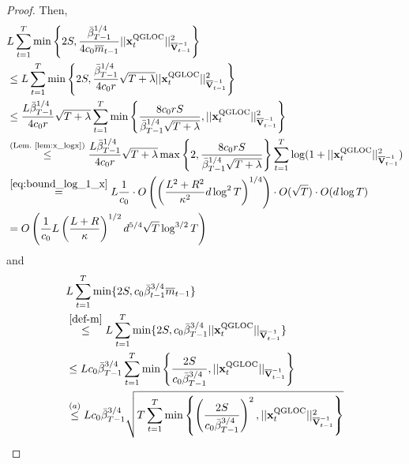 \begin{proof}

Then,
\begin{align*}
  &L\sum_{t=1}^T \min\left\{ 2S, { \frac{\bar\beta_{T-1}^{1/4}}{4 c_0 \overline{m}_{t-1}} } { ||\mathbf{x}_t^{\text{\normalfont QGLOC}}||^2_{\overline{\mathbf{V}}^{-1}_{t-1}} } \right\} 
\\&\le L\sum_{t=1}^T \min\left\{ 2S, { \frac{\bar\beta_{T-1}^{1/4}}{4 c_0 r} } \sqrt{T + \lambda} ||\mathbf{x}_t^{\text{\normalfont QGLOC}}||^2_{\overline{\mathbf{V}}^{-1}_{t-1}}  \right\}
\\&\le { \frac{L\bar\beta^{1/4}_{T-1}}{4c_0 r} } \sqrt{T + \lambda} \sum_{t=1}^T \min\left\{{ \frac{8 c_0 r S }{\bar\beta^{1/4}_{T-1} \sqrt{T + \lambda}} }, ||\mathbf{x}_t^{\text{\normalfont QGLOC}}||^2_{\overline{\mathbf{V}}^{-1}_{t-1}} \right\}
\\&\stackrel{(\text{Lem.~\ref{lem:x_logx}})}{\le} { \frac{L\bar\beta^{1/4}_{T-1}}{4c_0 r} } \sqrt{T + \lambda} \max\left\{2, { \frac{8 c_0 r S }{\bar\beta^{1/4}_{T-1} \sqrt{T + \lambda}} } \right\} \sum_{t=1}^T \log( 1 + ||\mathbf{x}_t^{\text{\normalfont QGLOC}}||^2_{\overline{\mathbf{V}}^{-1}_{t-1}} ) 
\\&\stackrel{\eqref{eq:bound_log_1_x}}{=} L { \frac{1}{c_0} } \cdot O\left( \left({ \frac{L^2+R^2}{{\kappa}^2} } d\log^2 T\right)^{1/4} \right) \cdot O(\sqrt{T}) \cdot O(d \log T) 
\\&= O\left( { \frac{1}{c_0} }L\left({ \frac{ L +  R }{{\kappa}} }\right)^{1/2} d^{5/4} \sqrt{T} \log^{3/2} T \right) \\
\end{align*}
and 
\begin{align*}
  &L\sum_{t=1}^T \min \{ 2S, c_0 \bar\beta_{t-1}^{3/4} \barm_{t-1} \}
\\&\stackrel{\eqref{def-m}}{\le} L\sum_{t=1}^T \min \{ 2S, c_0 \bar\beta_{T-1}^{3/4} || \x_t^\QGLOC ||_{\barV^{-1}_{t-1}} \} 
\\&\le Lc_0 \bar\beta_{T-1}^{3/4} \sum_{t=1}^T  \min \lt\{ \fr{2S}{c_0\bar\beta^{3/4}_{T-1}},  || \x_t^\QGLOC ||_{\barV^{-1}_{t-1}} \rt\} 
\\&\stackrel{(a)}{\le} Lc_0 \bar\beta_{T-1}^{3/4} \sqrt{T \sum_{t=1}^T  \min \lt\{ \lt(\fr{2S}{c_0\bar\beta^{3/4}_{T-1}}\rt)^2,  || \x_t^\QGLOC ||^2_{\barV^{-1}_{t-1}} \rt\} } 

\end{align*}
\end{proof}
